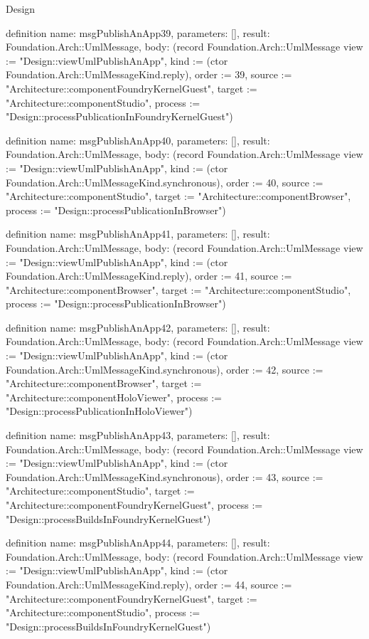 \begin{lexlean}{Design}
\begin{semanticmodule}
definition{
  name: msgPublishAnApp39,
  parameters: [],
  result: Foundation.Arch::UmlMessage,
  body: (record Foundation.Arch::UmlMessage {view := "Design::viewUmlPublishAnApp", kind := (ctor Foundation.Arch::UmlMessageKind.reply), order := 39, source := "Architecture::componentFoundryKernelGuest", target := "Architecture::componentStudio", process := "Design::processPublicationInFoundryKernelGuest"})
}

definition{
  name: msgPublishAnApp40,
  parameters: [],
  result: Foundation.Arch::UmlMessage,
  body: (record Foundation.Arch::UmlMessage {view := "Design::viewUmlPublishAnApp", kind := (ctor Foundation.Arch::UmlMessageKind.synchronous), order := 40, source := "Architecture::componentStudio", target := "Architecture::componentBrowser", process := "Design::processPublicationInBrowser"})
}

definition{
  name: msgPublishAnApp41,
  parameters: [],
  result: Foundation.Arch::UmlMessage,
  body: (record Foundation.Arch::UmlMessage {view := "Design::viewUmlPublishAnApp", kind := (ctor Foundation.Arch::UmlMessageKind.reply), order := 41, source := "Architecture::componentBrowser", target := "Architecture::componentStudio", process := "Design::processPublicationInBrowser"})
}

definition{
  name: msgPublishAnApp42,
  parameters: [],
  result: Foundation.Arch::UmlMessage,
  body: (record Foundation.Arch::UmlMessage {view := "Design::viewUmlPublishAnApp", kind := (ctor Foundation.Arch::UmlMessageKind.synchronous), order := 42, source := "Architecture::componentBrowser", target := "Architecture::componentHoloViewer", process := "Design::processPublicationInHoloViewer"})
}

definition{
  name: msgPublishAnApp43,
  parameters: [],
  result: Foundation.Arch::UmlMessage,
  body: (record Foundation.Arch::UmlMessage {view := "Design::viewUmlPublishAnApp", kind := (ctor Foundation.Arch::UmlMessageKind.synchronous), order := 43, source := "Architecture::componentStudio", target := "Architecture::componentFoundryKernelGuest", process := "Design::processBuildsInFoundryKernelGuest"})
}

definition{
  name: msgPublishAnApp44,
  parameters: [],
  result: Foundation.Arch::UmlMessage,
  body: (record Foundation.Arch::UmlMessage {view := "Design::viewUmlPublishAnApp", kind := (ctor Foundation.Arch::UmlMessageKind.reply), order := 44, source := "Architecture::componentFoundryKernelGuest", target := "Architecture::componentStudio", process := "Design::processBuildsInFoundryKernelGuest"})
}


\end{semanticmodule}
\end{lexlean}
